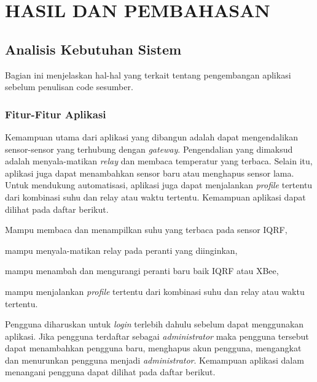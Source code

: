 
\chapter{HASIL DAN PEMBAHASAN}
	\section{Analisis Kebutuhan Sistem}
		Bagian ini menjelaskan hal-hal yang terkait tentang pengembangan aplikasi sebelum penulisan code sesumber.

		\subsection{Fitur-Fitur Aplikasi}
			Kemampuan utama dari aplikasi yang dibangun adalah dapat mengendalikan sensor-sensor yang terhubung dengan \emph{gateway}. Pengendalian yang dimaksud adalah menyala-matikan \emph{relay} dan membaca temperatur yang terbaca. Selain itu, aplikasi juga dapat menambahkan sensor baru atau menghapus sensor lama. Untuk mendukung automatisasi, aplikasi juga dapat menjalankan \emph{profile} tertentu dari kombinasi suhu dan relay atau waktu tertentu. Kemampuan aplikasi dapat dilihat pada daftar berikut.

			\vspace{-0.5cm}

			\begin{itemize}
			\end{itemize}

			Pengguna diharuskan untuk \emph{login} terlebih dahulu sebelum dapat menggunakan aplikasi. Jika pengguna terdaftar sebagai \emph{administrator} maka pengguna tersebut dapat menambahkan pengguna baru, menghapus akun pengguna, mengangkat dan menurunkan pengguna menjadi \emph{administrator}. Kemampuan aplikasi dalam menangani pengguna dapat dilihat pada daftar berikut.

